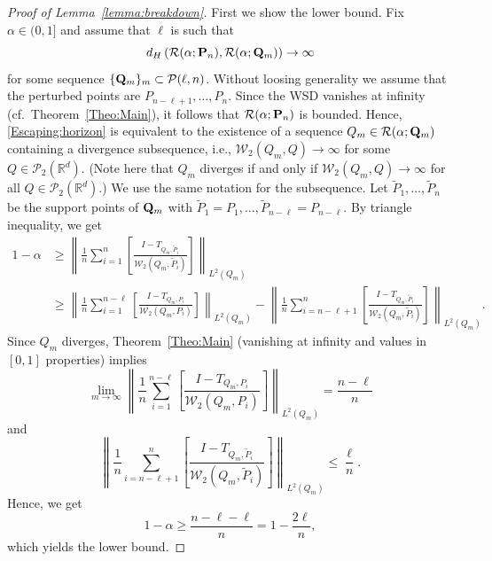 \documentclass{imsart}
\numberwithin{equation}{section}
\def\R{\mathbb{R}}
\begin{document}
\begin{proof}[Proof of Lemma~\ref{lemma:breakdown}]
	First we show the lower bound. Fix $\alpha\in (0,1]$ and assume that $\ell$ is such that
	\begin{equation}
		\label{Escaping:horizon}
		d_H \left(\mathcal{R}(\alpha; {\bf P}_n) ,\mathcal{R}(\alpha;{\bf Q}_{m})\right) \to \infty
	\end{equation}
	for some sequence $\{{\bf Q}_{m}\}_m\subset \mathcal{P}({\ell,n}) $. Without loosing generality we assume that the perturbed points are $P_{n-\ell+1}, \dots, P_n$. Since the  WSD vanishes at infinity  (cf.~Theorem~\ref{Theo:Main}), it follows that $\mathcal{R}(\alpha; {\bf P}_n)$ is bounded. Hence,  \eqref{Escaping:horizon} is equivalent to the existence of a  sequence $Q_m\in \mathcal{R}(\alpha;{\bf Q}_{m})$ containing a divergence subsequence, i.e., $\mathcal{W}_2(Q_{m},Q)\to \infty $ for some $Q\in \mathcal{P}_2(\R^d)$. (Note here that $Q_{m}$ diverges if and only if   $\mathcal{W}_2(Q_{m},Q)\to \infty $ for all $Q\in \mathcal{P}_2(\R^d)$.) We use the same notation for the subsequence.
	Let $\widetilde{P}_1,\ldots,\widetilde{P}_n$ be the support points of ${\bf Q}_m$ with $\widetilde{P}_1=P_1,\ldots,\widetilde{P}_{n-\ell} = P_{n - \ell}$.
	By triangle inequality, we get 
	\begin{align*}
		1-\alpha & \ge \left\|\frac{1}{n}\sum_{i=1}^n \left[  \frac{I-T_{Q_m,\widetilde{P}_i} }{\mathcal{W}_2(Q_m, \widetilde{P}_i)}\right]\right\|_{L^2(Q_m)}\\
		&\geq \left\|\frac{1}{n}\sum_{i=1}^{n-\ell} \left[  \frac{I-T_{Q_m,P_i} }{\mathcal{W}_2(Q_m, P_i)}\right]\right\|_{L^2(Q_m)}- \left\|\frac{1}{n}\sum_{i = n-\ell +1}^n \left[  \frac{I-T_{Q_m,\widetilde{P}_i} }{\mathcal{W}_2(Q_m, \widetilde{P}_i)}\right]\right\|_{L^2(Q_m)}.
	\end{align*}
	Since $Q_m$ diverges, Theorem~\ref{Theo:Main} (vanishing at infinity and values in $[0,1]$ properties) implies 
	$$ \lim_{m \to \infty} \left\|\frac{1}{n}\sum_{i=1}^{n-\ell} \left[  \frac{I-T_{Q_m,P_i} }{\mathcal{W}_2(Q_m, P_i)}\right]\right\|_{L^2(Q_m)}= \frac{n-\ell}{n} $$
	and 
	$$ \left\|\frac{1}{n}\sum_{i = n-\ell +1}^n \left[  \frac{I-T_{Q_m,\widetilde{P}_i} }{\mathcal{W}_2(Q_m, \widetilde{P}_i)}\right]\right\|_{L^2(Q_m)} \leq \frac{\ell}{n}.$$
	Hence, we get 
	$$ 1-\alpha \geq  \frac{n-\ell-\ell}{n}=1-\frac{2\ell}{n}, $$
	which yields the lower bound. 
	

\end{proof}
\end{document}
